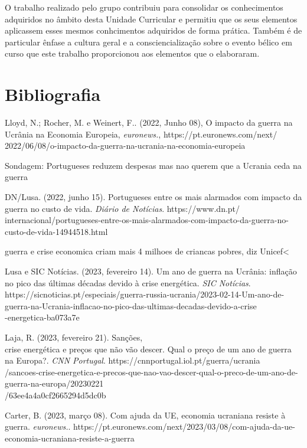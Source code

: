 \documentclass[12pt]{report}
\begin{document}
{O trabalho realizado pelo grupo contribuiu para consolidar os conhecimentos adquiridos no âmbito desta Unidade Curricular e permitiu que os seus elementos aplicassem esses mesmos conhcimentos adquiridos de forma prática. Também é de particular ênfase a cultura geral e a consciencialização sobre o evento bélico em curso que este trabalho proporcionou aos elementos que o elaboraram.


\chapter{Bibliografia}
{Lloyd, N.; Rocher, M. e Weinert, F.. (2022, Junho 08), O impacto da guerra na Ucrânia na Economia Europeia, \textit{euronews.}, https://pt.euronews.com/next/ \\ 2022/06/08/o-impacto-da-guerra-na-ucrania-na-economia-europeia


Sondagem: Portugueses reduzem despesas mas nao querem que a Ucrania ceda na guerra 


DN/Lusa. (2022, junho 15). Portugueses entre os mais alarmados com impacto da guerra no custo de vida. \textit{Diário de Notícias}. https://www.dn.pt/ \\ internacional/portugueses-entre-os-mais-alarmados-com-impacto-da-guerra-no-custo-de-vida-14944518.html



guerra e crise economica criam mais 4 milhoes de criancas pobres, diz Unicef<



Lusa e SIC Notícias. (2023, fevereiro 14). Um ano de guerra na Ucrânia: inflação no pico das últimas décadas devido à crise energética. \textit{SIC Notícias}. https://sicnoticias.pt/especiais/guerra-russia-ucrania/2023-02-14-Um-ano-de-guerra-na-Ucrania-inflacao-no-pico-das-ultimas-decadas-devido-a-crise \\ -energetica-ba073a7e


Laja, R. (2023, fevereiro 21). Sanções, \\ crise energética e preços que não vão descer. Qual o preço de um ano de guerra na Europa?. \textit{CNN Portugal}. https://cnnportugal.iol.pt/guerra/ucrania \\ /sancoes-crise-energetica-e-precos-que-nao-vao-descer-qual-o-preco-de-um-ano-de-guerra-na-europa/20230221 \\ /63ee4a4a0cf2665294d5dc0b

Carter, B. (2023, março 08). Com ajuda da UE, economia ucraniana resiste à guerra. \textit{euronews.}. https://pt.euronews.com/next/2023/03/08/com-ajuda-da-ue-economia-ucraniana-resiste-a-guerra

}}
\end{document}
